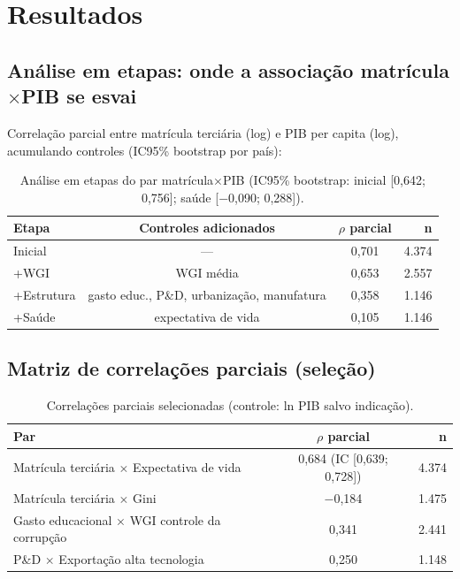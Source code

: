 \documentclass[12pt,a4paper]{article}
\begin{document}
\section{Resultados}

\subsection{Análise em etapas: onde a associação matrícula$\times$PIB se esvai}

Correlação parcial entre matrícula terciária (log) e PIB per capita (log), acumulando controles (IC95\% bootstrap por país):

\begin{table}[h!]
\centering
\small
\begin{tabular}{lccr}
\toprule
\textbf{Etapa} & \textbf{Controles adicionados} & \textbf{$\rho$ parcial} & \textbf{n} \\
\midrule
Inicial & --- & 0,701 & 4.374 \\
+WGI & WGI média & 0,653 & 2.557 \\
+Estrutura & gasto educ., P\&D, urbanização, manufatura & 0,358 & 1.146 \\
+Saúde & expectativa de vida & 0,105 & 1.146 \\
\bottomrule
\end{tabular}
\caption{Análise em etapas do par matrícula$\times$PIB (IC95\% bootstrap: inicial [0,642; 0,756]; saúde [$-$0,090; 0,288]).}
\end{table}

\subsection{Matriz de correlações parciais (seleção)}

\begin{table}[h!]
\centering
\small
\begin{tabular}{lcr}
\toprule
\textbf{Par} & \textbf{$\rho$ parcial} & \textbf{n} \\
\midrule
Matrícula terciária $\times$ Expectativa de vida & 0,684 (IC [0,639; 0,728]) & 4.374 \\
Matrícula terciária $\times$ Gini & $-$0,184 & 1.475 \\
Gasto educacional $\times$ WGI controle da corrupção & 0,341 & 2.441 \\
P\&D $\times$ Exportação alta tecnologia & 0,250 & 1.148 \\
\bottomrule
\end{tabular}
\caption{Correlações parciais selecionadas (controle: ln PIB salvo indicação).}
\end{table}
\end{document}

